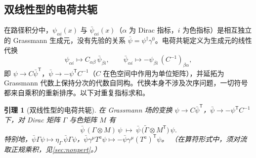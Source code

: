 \documentclass[UTF8,a4paper,11pt,fontset=fandol]{ctexart}
\theoremstyle{cplain}
\newtheorem{lemma}[theorem]{引理}
\theoremstyle{cdefinition}
\theoremstyle{cremark}
\numberwithin{equation}{section}
\newcommand{\tp}{\mathsf{T}}                         %
\newcommand{\Cconj}[1]{\widetilde{#1}}              %
\begin{document}
\subsection{双线性型的电荷共轭}\label{sec:dirac-bilinear}

在路径积分中，$\psi_{\alpha i}(x)$ 与 $\bar\psi_{\alpha i}(x)$（$\alpha$ 为 Dirac 指标，$i$ 为色指标）是相互独立的 Grassmann 生成元，没有先验的关系 $\bar\psi=\psi^\dagger\gamma^0$。电荷共轭定义为生成元的线性代换
\begin{equation}\label{eq:dirac-Cfields}
\psi_{\alpha i}\longmapsto C_{\alpha\beta}\,\bar\psi_{\beta i},\qquad
\bar\psi_{\alpha i}\longmapsto-\psi_{\beta i}\,(C^{-1})_{\beta\alpha},
\end{equation}
即 $\psi\to C\bar\psi^{\tp}$，$\bar\psi\to-\psi^{\tp}C^{-1}$（$C$ 在色空间中作用为单位矩阵），并延拓为 Grassmann 代数上保持分次的代数自同构。代换本身不涉及次序问题，一切符号都来自乘积的重新排序。以下对重复指标求和。

\begin{lemma}[双线性型的电荷共轭]\label{lem:bilinear}
在 Grassmann 场的变换 $\psi\to C\bar\psi^{\tp}$，$\bar\psi\to-\psi^{\tp}C^{-1}$ 下，对 Dirac 矩阵 $\Gamma$ 与色矩阵 $M$ 有
\begin{equation}\label{eq:bilinear}
\bar\psi\,(\Gamma\otimes M)\,\psi\ \longmapsto\ \bar\psi\,\bigl(\Cconj\Gamma\otimes M^{\tp}\bigr)\,\psi .
\end{equation}
特别地，$\bar\psi\Gamma\psi\mapsto\eta_\Gamma\,\bar\psi\Gamma\psi$，$\bar\psi\gamma^\mu T^a\psi\mapsto-\bar\psi\gamma^\mu(T^a)^{\tp}\psi$。
（在算符形式中，须对流取正规乘积，见\cref{sec:nonpert}。）
\end{lemma}
\end{document}
